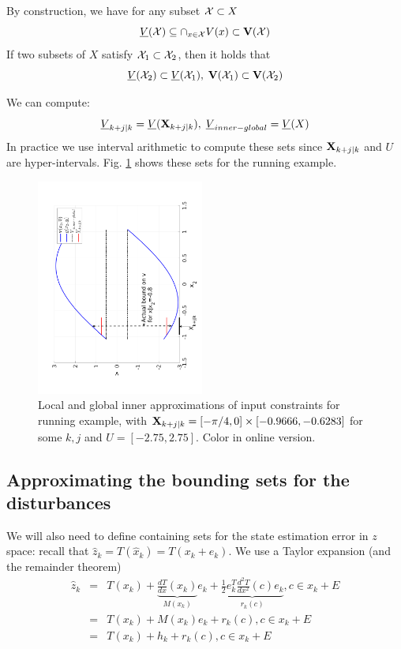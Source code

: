 By construction, we have for any subset $\mathcal{X} \subset X$
\begin{equation}
\label{eq:Vbounds}
\underline{V}(\mathcal{X}) \subseteq \cap_{x \in \mathcal{X}} V(x) \subset \mathbf{V}(\mathcal{X})
\end{equation}
If two subsets of $X$ satisfy $\mathcal{X}_1 \subset \mathcal{X}_2$, then it holds that 
\begin{equation}
\label{eq:V inclusions}
\underline{V}(\mathcal{X}_2) \subset \underline{V}(\mathcal{X}_1), \; \mathbf{V}(\mathcal{X}_1) \subset \mathbf{V}(\mathcal{X}_2)
\end{equation}

We can compute:
\begin{equation}
\label{eq:Vkj Vmax}
\underline{V}_{k+j|k}  = \underline{V}(\mathbf{X}_{k+j|k}), \; \underline{V}_{inner-global} = \underline{V}(X)
\end{equation}
In practice we use interval arithmetic to compute these sets since $\mathbf{X}_{k+j|k}$ and $U$ are hyper-intervals.
Fig. \ref{fig:err bounds toy} shows these sets for the running example.
\begin{figure}
	\includegraphics[angle=270,width=0.49\textwidth]{figs/InputToy.pdf}
	\caption{Local and global inner approximations of input constraints for running example, with $\mathbf{X}_{k+j|k} =  [-\pi/4,0]\times[-0.9666,-0.6283]$ for some $k,j$ and $U = [-2.75,2.75]$. Color in online version.}
	\label{fig:err bounds toy}
\end{figure}


\subsection{Approximating the bounding sets for the disturbances}
\label{sec:approx dist}
We will also need to define containing sets for the state estimation error in $z$ space:
recall that $\hat{z}_k = T(\hat{x}_k) = T(x_k+e_k)$. 
We use a Taylor expansion (and the remainder theorem)
\begin{eqnarray}
\label{eq:taylor expansion T}
\hat{z}_k &=& T(x_k) + \underbrace{\frac{dT}{dx}(x_k)}_{M(x_k)}e_k+ \underbrace{\frac{1}{2}e_k^T \frac{d^2T}{dx^2}(c)e_k}_{r_k(c)}, c \in x_k + E \nonumber 
\\
&=& T(x_k) + M(x_k)e_k+ r_k(c), c \in x_k + E \nonumber
\\
&=& T(x_k) + h_{k}+ r_k(c), c \in x_k + E \nonumber
\end{eqnarray}

